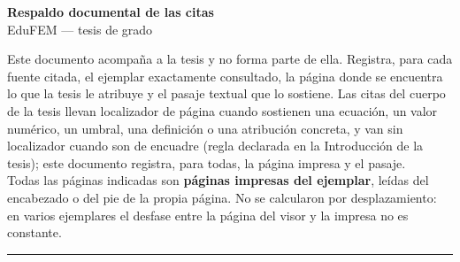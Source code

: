 \documentclass[11pt,a4paper]{article}
\begin{document}
\begin{center}
{\LARGE\bfseries Respaldo documental de las citas}\\[3pt]
{\large EduFEM --- tesis de grado}\\[8pt]
\begin{minipage}{0.86\textwidth}\small
Este documento acompaña a la tesis y no forma parte de ella. Registra, para cada fuente citada, el ejemplar exactamente consultado, la página donde se encuentra lo que la tesis le atribuye y el pasaje textual que lo sostiene. Las citas del cuerpo de la tesis llevan localizador de página cuando sostienen una ecuación, un valor numérico, un umbral, una definición o una atribución concreta, y van sin localizador cuando son de encuadre (regla declarada en la Introducción de la tesis); este documento registra, para todas, la página impresa y el pasaje.\\[4pt]
Todas las páginas indicadas son \textbf{páginas impresas del ejemplar}, leídas del encabezado o del pie de la propia página. No se calcularon por desplazamiento: en varios ejemplares el desfase entre la página del visor y la impresa no es constante.
\end{minipage}\end{center}
\vspace{4pt}\hrule\vspace{10pt}
\end{document}

